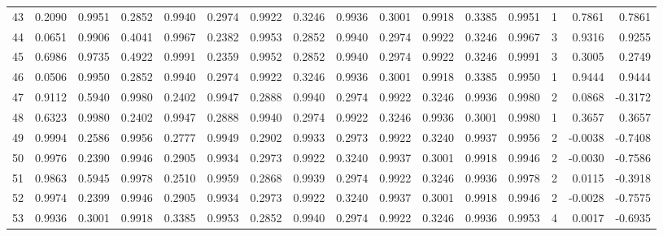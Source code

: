 \begin{tabular}{lrrrrrrrrrrrrrrr}
43  &      0.2090 &  0.9951 &  0.2852 &  0.9940 &  0.2974 &  0.9922 &  0.3246 &  0.9936 &  0.3001 &  0.9918 &   0.3385 &     0.9951 &      1 &                    0.7861 &                     0.7861 \\
44  &      0.0651 &  0.9906 &  0.4041 &  0.9967 &  0.2382 &  0.9953 &  0.2852 &  0.9940 &  0.2974 &  0.9922 &   0.3246 &     0.9967 &      3 &                    0.9316 &                     0.9255 \\
45  &      0.6986 &  0.9735 &  0.4922 &  0.9991 &  0.2359 &  0.9952 &  0.2852 &  0.9940 &  0.2974 &  0.9922 &   0.3246 &     0.9991 &      3 &                    0.3005 &                     0.2749 \\
46  &      0.0506 &  0.9950 &  0.2852 &  0.9940 &  0.2974 &  0.9922 &  0.3246 &  0.9936 &  0.3001 &  0.9918 &   0.3385 &     0.9950 &      1 &                    0.9444 &                     0.9444 \\
47  &      0.9112 &  0.5940 &  0.9980 &  0.2402 &  0.9947 &  0.2888 &  0.9940 &  0.2974 &  0.9922 &  0.3246 &   0.9936 &     0.9980 &      2 &                    0.0868 &                    -0.3172 \\
48  &      0.6323 &  0.9980 &  0.2402 &  0.9947 &  0.2888 &  0.9940 &  0.2974 &  0.9922 &  0.3246 &  0.9936 &   0.3001 &     0.9980 &      1 &                    0.3657 &                     0.3657 \\
49  &      0.9994 &  0.2586 &  0.9956 &  0.2777 &  0.9949 &  0.2902 &  0.9933 &  0.2973 &  0.9922 &  0.3240 &   0.9937 &     0.9956 &      2 &                   -0.0038 &                    -0.7408 \\
50  &      0.9976 &  0.2390 &  0.9946 &  0.2905 &  0.9934 &  0.2973 &  0.9922 &  0.3240 &  0.9937 &  0.3001 &   0.9918 &     0.9946 &      2 &                   -0.0030 &                    -0.7586 \\
51  &      0.9863 &  0.5945 &  0.9978 &  0.2510 &  0.9959 &  0.2868 &  0.9939 &  0.2974 &  0.9922 &  0.3246 &   0.9936 &     0.9978 &      2 &                    0.0115 &                    -0.3918 \\
52  &      0.9974 &  0.2399 &  0.9946 &  0.2905 &  0.9934 &  0.2973 &  0.9922 &  0.3240 &  0.9937 &  0.3001 &   0.9918 &     0.9946 &      2 &                   -0.0028 &                    -0.7575 \\
53  &      0.9936 &  0.3001 &  0.9918 &  0.3385 &  0.9953 &  0.2852 &  0.9940 &  0.2974 &  0.9922 &  0.3246 &   0.9936 &     0.9953 &      4 &                    0.0017 &                    -0.6935 \\

\end{tabular}
